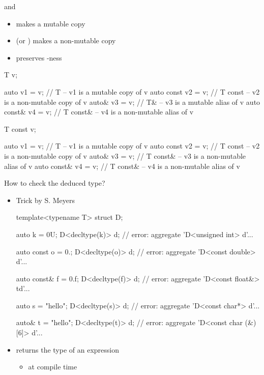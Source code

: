 \begin{frame}[fragile]{ and }

  \begin{itemize}
  \item {} makes a mutable copy
  \item {} (or ) makes a non-mutable copy
  \item {} preserves -ness
  \end{itemize}

  \begin{codeblock}
T v;

auto        v1 = v; // T        -- v1 is a mutable copy of v
auto const  v2 = v; // T const  -- v2 is a non-mutable copy of v
auto\&       v3 = v; // \alert{T\&}       -- v3 is a \alert{mutable} alias of v
auto const\& v4 = v; // T const\& -- v4 is a non-mutable alias of v\end{codeblock}

  \begin{codeblock}
T const v;

auto        v1 = v; // T        -- v1 is a mutable copy of v
auto const  v2 = v; // T const  -- v2 is a non-mutable copy of v
auto\&       v3 = v; // \alert{T const\&} -- v3 is a \alert{non-mutable} alias of v
auto const\& v4 = v; // T const\& -- v4 is a non-mutable alias of v\end{codeblock}

\end{frame}

\begin{frame}[fragile]{How to check the deduced type?}
  \begin{itemize}
  \item Trick by S. Meyers
    \begin{codeblock}{
template<typename T> struct D;

auto k = 0U;
D<decltype(k)> d; // error: aggregate 'D<\alert{unsigned int}> d'...

auto const o = 0.;
D<decltype(o)> d; // error: aggregate 'D<\alert{const double}> d'...

auto const\& f = 0.f;
D<decltype(f)> d; // error: aggregate 'D<\alert{const float\&}> td'...

auto s = "hello";
D<decltype(s)> d; // error: aggregate 'D<\alert{const char*}> d'...

auto\& t = "hello";
D<decltype(t)> d; // error: aggregate 'D<\alert{const char (\&)[6]}> d'...}\end{codeblock}

  \item {} returns the type of an expression
    \begin{itemize}
    \item at compile time
    \end{itemize}
  \end{itemize}
\end{frame}

